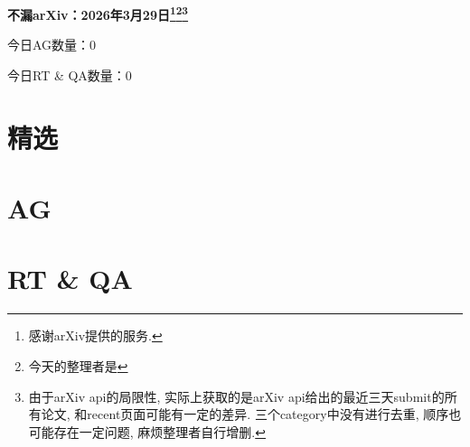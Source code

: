\documentclass[9pt, a4paper]{article}
\theoremstyle{plain}
\theoremstyle{definition}
\theoremstyle{remark}
\newcommand{\AGnumber}{0}
\newcommand{\RTQAnumber}{0}
\newcommand{\NewestDate}{2026年3月29日}
\newcommand{\todayarXiver}{} %
\begin{document}
\begin{center}
    \Huge\textbf{不漏arXiv：\NewestDate\footnote{感谢arXiv提供的服务.}\footnote{今天的整理者是\todayarXiver}\footnote{由于arXiv api的局限性, 实际上获取的是arXiv api给出的最近三天submit的所有论文, 和recent页面可能有一定的差异. 三个category中没有进行去重, 顺序也可能存在一定问题, 麻烦整理者自行增删.}} \\
\end{center}

\setcounter{section}{-1}

\begin{center}
    今日AG数量：\AGnumber
    
    今日RT \& QA数量：\RTQAnumber
    
\end{center}


\section{精选}


\section{AG}

\section{RT \& QA}
\end{document}

